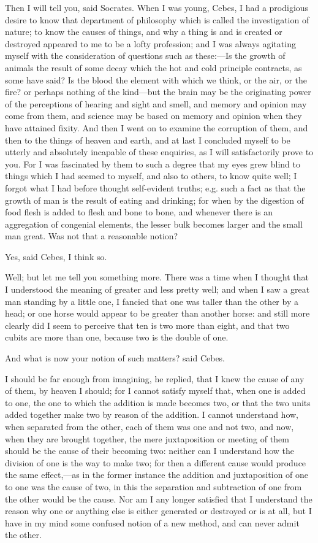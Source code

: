 Then I will tell you, said Socrates. When I was young, Cebes, I had a
prodigious desire to know that department of philosophy which is called
the investigation of nature; to know the causes of things, and why a thing
is and is created or destroyed appeared to me to be a lofty profession;
and I was always agitating myself with the consideration of questions such
as these:—Is the growth of animals the result of some decay which
the hot and cold principle contracts, as some have said? Is the blood the
element with which we think, or the air, or the fire? or perhaps nothing
of the kind—but the brain may be the originating power of the
perceptions of hearing and sight and smell, and memory and opinion may
come from them, and science may be based on memory and opinion when they
have attained fixity. And then I went on to examine the corruption of
them, and then to the things of heaven and earth, and at last I concluded
myself to be utterly and absolutely incapable of these enquiries, as I
will satisfactorily prove to you. For I was fascinated by them to such a
degree that my eyes grew blind to things which I had seemed to myself, and
also to others, to know quite well; I forgot what I had before thought
self-evident truths; e.g. such a fact as that the growth of man is the
result of eating and drinking; for when by the digestion of food flesh is
added to flesh and bone to bone, and whenever there is an aggregation of
congenial elements, the lesser bulk becomes larger and the small man
great. Was not that a reasonable notion?

Yes, said Cebes, I think so.

Well; but let me tell you something more. There was a time when I thought
that I understood the meaning of greater and less pretty well; and when I
saw a great man standing by a little one, I fancied that one was taller
than the other by a head; or one horse would appear to be greater than
another horse: and still more clearly did I seem to perceive that ten is
two more than eight, and that two cubits are more than one, because two is
the double of one.

And what is now your notion of such matters? said Cebes.

I should be far enough from imagining, he replied, that I knew the cause
of any of them, by heaven I should; for I cannot satisfy myself that, when
one is added to one, the one to which the addition is made becomes two, or
that the two units added together make two by reason of the addition. I
cannot understand how, when separated from the other, each of them was one
and not two, and now, when they are brought together, the mere
juxtaposition or meeting of them should be the cause of their becoming
two: neither can I understand how the division of one is the way to make
two; for then a different cause would produce the same effect,—as in
the former instance the addition and juxtaposition of one to one was the
cause of two, in this the separation and subtraction of one from the other
would be the cause. Nor am I any longer satisfied that I understand the
reason why one or anything else is either generated or destroyed or is at
all, but I have in my mind some confused notion of a new method, and can
never admit the other.


